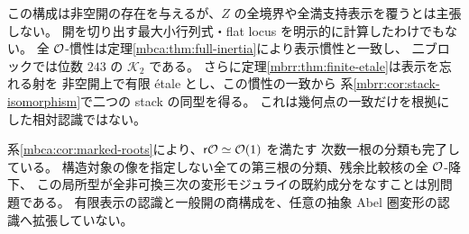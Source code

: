 \begin{remark}[得られた開と残る問題]
\label{mbg:rem:scope}
この構成は非空開の存在を与えるが、$Z$ の全境界や全満支持表示を覆うとは主張しない。
開を切り出す最大小行列式・flat locus を明示的に計算したわけでもない。
全 $\mathcal O$-慣性は定理\ref{mbca:thm:full-inertia}により表示慣性と一致し、
二ブロックでは位数 $243$ の $\mathcal K_2$ である。
さらに定理\ref{mbrr:thm:finite-etale}は表示を忘れる射を
非空開上で有限 \'etale とし、この慣性の一致から
系\ref{mbrr:cor:stack-isomorphism}で二つの stack の同型を得る。
これは幾何点の一致だけを根拠にした相対認識ではない。

系\ref{mbca:cor:marked-roots}により、$\mathsf r\mathcal O\simeq\mathcal O(1)$ を満たす
次数一根の分類も完了している。
構造対象の像を指定しない全ての第三根の分類、残余比較核の全 $\mathcal O$-降下、
この局所型が全非可換三次の変形モジュライの既約成分をなすことは別問題である。
有限表示の認識と一般開の商構成を、任意の抽象 Abel 圏変形の認識へ拡張していない。
\end{remark}
